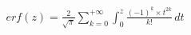 \documentclass[preview]{standalone}
\begin{document}
\begin{align*}
erf(z) = { \frac{2}{\sqrt{\pi}} } \sum_{k=0}^{+\infty} \int_0^z { { \frac{(-1)^k \times t^{2k}}{k!} } } \, dt
\end{align*}
\end{document}
